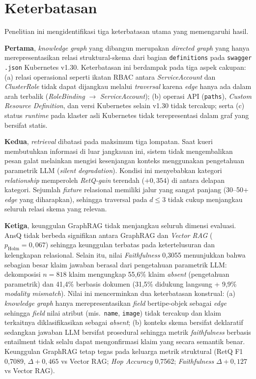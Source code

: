 \section{Keterbatasan}

Penelitian ini mengidentifikasi tiga keterbatasan utama yang memengaruhi hasil.

\textbf{Pertama}, \textit{knowledge graph} yang dibangun merupakan \textit{directed graph} yang hanya merepresentasikan relasi struktural-skema dari bagian \texttt{definitions} pada \texttt{swagger .json} Kubernetes v1.30. Keterbatasan ini berdampak pada tiga aspek cakupan: (a) relasi operasional seperti ikatan RBAC antara \textit{ServiceAccount} dan \textit{ClusterRole} tidak dapat dijangkau melalui \textit{traversal} karena \textit{edge} hanya ada dalam arah terbalik (\textit{RoleBinding} $\to$ \textit{ServiceAccount}); (b) operasi API (\texttt{paths}), \textit{Custom Resource Definition}, dan versi Kubernetes selain v1.30 tidak tercakup; serta (c) status \textit{runtime} pada klaster asli Kubernetes tidak terepresentasi dalam graf yang bersifat statis.

\textbf{Kedua}, \textit{retrieval} dibatasi pada maksimum tiga lompatan. Saat kueri membutuhkan informasi di luar jangkauan ini, sistem tidak mengembalikan pesan galat melainkan mengisi kesenjangan konteks menggunakan pengetahuan parametrik LLM (\textit{silent degradation}). Kondisi ini menyebabkan kategori \textit{relationship} memperoleh \textit{RetQ-gain} terendah ($+0{,}354$) di antara delapan kategori. Sejumlah \textit{fixture} relasional memiliki jalur yang sangat panjang (30--50+ \textit{edge} yang diharapkan), sehingga traversal pada $d{\leq}3$ tidak cukup menjangkau seluruh relasi skema yang relevan.

\textbf{Ketiga}, keunggulan GraphRAG tidak menjangkau seluruh dimensi evaluasi. AnsQ tidak berbeda signifikan antara GraphRAG dan \textit{Vector RAG} ($p_{\text{Holm}}{=}0{,}067$) sehingga keunggulan terbatas pada ketertelusuran dan kelengkapan relasional. Selain itu, nilai \textit{Faithfulness} 0,3055 menunjukkan bahwa sebagian besar klaim jawaban berasal dari pengetahuan parametrik LLM: dekomposisi $n{=}818$ klaim mengungkap 55,6\% klaim \textit{absent} (pengetahuan parametrik) dan 41,4\% berbasis dokumen (31,5\% didukung langsung + 9,9\% \textit{modality mismatch}). Nilai ini mencerminkan dua keterbatasan konstrual: (a) \textit{knowledge graph} hanya merepresentasikan \textit{field} bertipe-objek sebagai \textit{edge} sehingga \textit{field} nilai atribut (mis.\ \texttt{name}, \texttt{image}) tidak tercakup dan klaim terkaitnya diklasifikasikan sebagai \textit{absent}; (b) konteks skema bersifat deklaratif sedangkan jawaban LLM bersifat prosedural sehingga metrik \textit{faithfulness} berbasis entailment tidak selalu dapat mengonfirmasi klaim yang secara semantik benar. Keunggulan GraphRAG tetap tegas pada keluarga metrik struktural (RetQ F1 0,7089, $\Delta{+}0{,}465$ vs Vector RAG; \textit{Hop Accuracy} 0,7562; \textit{Faithfulness} $\Delta{+}0{,}127$ vs Vector RAG).

